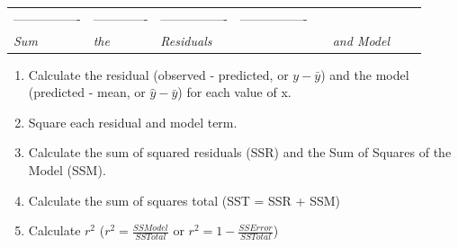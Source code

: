 \documentclass[]{article}
\begin{document}
\begin{longtable}[]{@{}llllllll@{}}
\begin{minipage}[t]{0.12\columnwidth}
----------------\strut
\end{minipage} & \begin{minipage}[t]{0.12\columnwidth}\raggedright
-------------\strut
\end{minipage} & \begin{minipage}[t]{0.12\columnwidth}\raggedright
----------------\strut
\end{minipage} & \begin{minipage}[t]{0.12\columnwidth}\raggedright
----------------\strut
\end{minipage}\tabularnewline
\begin{minipage}[t]{0.02\columnwidth}\raggedright
\emph{Sum}\strut
\end{minipage} & \begin{minipage}[t]{0.04\columnwidth}\raggedright
\emph{the}\strut
\end{minipage} & \begin{minipage}[t]{0.10\columnwidth}\raggedright
\emph{Residuals}\strut
\end{minipage} & \begin{minipage}[t]{0.12\columnwidth}\raggedright
\strut
\end{minipage} & \begin{minipage}[t]{0.12\columnwidth}\raggedright
\strut
\end{minipage} & \begin{minipage}[t]{0.12\columnwidth}\raggedright
\emph{and Model}\strut
\end{minipage} & \begin{minipage}[t]{0.12\columnwidth}\raggedright
\strut
\end{minipage} & \begin{minipage}[t]{0.12\columnwidth}\raggedright
\strut
\end{minipage}\tabularnewline
\bottomrule
\end{longtable}

\begin{enumerate}
\def\labelenumi{\arabic{enumi}.}
\item
  Calculate the residual (observed - predicted, or \(y-\bar{y}\)) and
  the model (predicted - mean, or \(\hat{y}-\bar{y}\)) for each value of
  x.
\item
  Square each residual and model term.
\item
  Calculate the sum of squared residuals (SSR) and the Sum of Squares of
  the Model (SSM).
\item
  Calculate the sum of squares total (SST = SSR + SSM) \vspace{1 in}
\item
  Calculate \(r^2\) (\(r^2 = \frac{SSModel}{SSTotal}\) or
  \(r^2 = 1- \frac{SSError}{SSTotal}\))
\end{enumerate}
\end{document}
